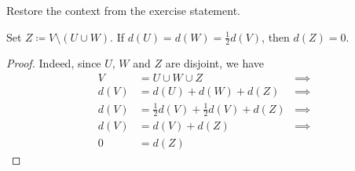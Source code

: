 \documentclass[a4paper,10pt, leqno]{article}
\theoremstyle{definition}
\begin{document}
\begin{proposition} Restore the context from the exercise statement.

 Set $Z \coloneqq V \setminus (U \cup W)$.
 If $d(U) = d(W) = \frac{1}{2} d(V)$, then $d(Z) = 0$.
\end{proposition}
\begin{proof}
 Indeed, since $U$, $W$ and $Z$ are disjoint, we have
\begin{align*}
 V &= U \cup W \cup Z &\implies \\
 d(V) &= d(U) + d(W) + d(Z) &\implies \\
 d(V) &= \frac{1}{2} d(V) + \frac{1}{2} d(V) + d(Z) &\implies \\
 d(V) &= d(V) + d(Z) &\implies \\
 0 &= d(Z)
\end{align*}

\end{proof}
\end{document}
